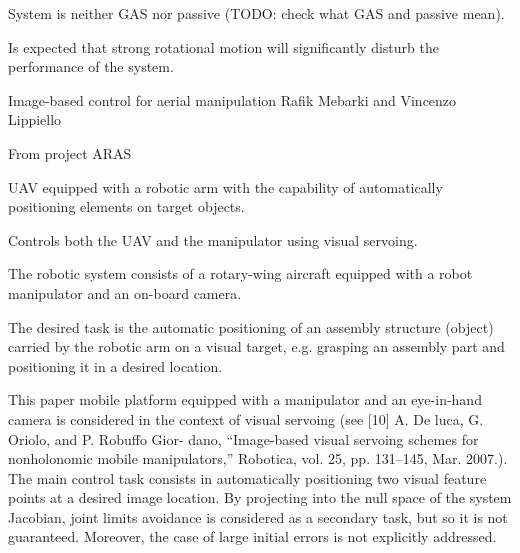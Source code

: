 System is neither GAS nor passive (TODO: check what GAS and passive mean).

Is expected that strong rotational motion will significantly disturb the performance of the system.

\cite{bourquardez_stability_2006}

Image-based control for aerial manipulation
Rafik Mebarki and Vincenzo Lippiello

From project ARAS

UAV equipped with a robotic arm with the capability of automatically positioning elements on target objects.

Controls both the UAV and the manipulator using visual servoing.

The robotic system consists of a rotary-wing aircraft equipped with a robot manipulator and an on-board camera. 

The desired task is the automatic positioning of an assembly structure (object) carried by the robotic arm on a visual target, e.g. grasping an assembly part and positioning it in a desired location.

This paper mobile platform equipped with a manipulator and an eye-in-hand camera is considered in the context of visual servoing (see 
[10] A. De luca, G. Oriolo, and P. Robuffo Gior- dano, “Image-based visual servoing schemes for nonholonomic mobile manipulators,” Robotica, vol. 25, pp. 131–145, Mar. 2007.). The main control task consists in automatically positioning two visual feature points at a desired image location. By projecting into the null space of the system Jacobian, joint limits avoidance is considered as a secondary task, but so it is not guaranteed. Moreover, the case of large initial errors is not explicitly addressed.



